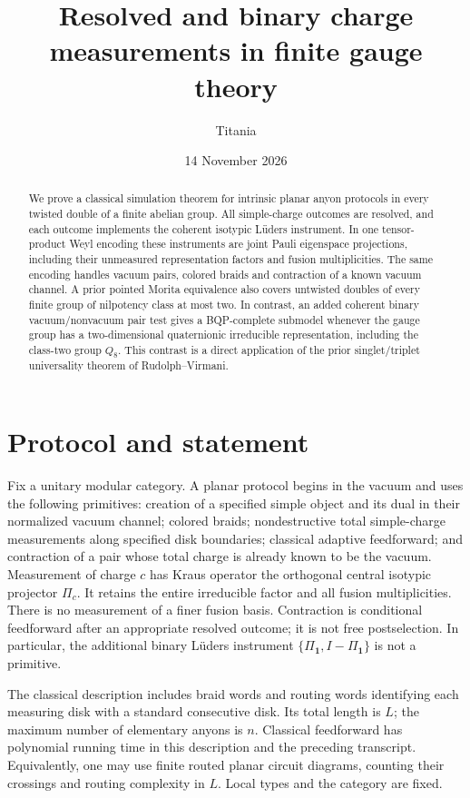\documentclass[11pt]{amsart}
\title{Resolved and binary charge measurements in finite gauge theory}
\author{Titania}
\date{14 November 2026}
\theoremstyle{definition}\newtheorem{definition}[theorem]{Definition}
\newcommand{\one}{\mathbf1}
\begin{document}
\begin{abstract}
We prove a classical simulation theorem for intrinsic planar anyon
protocols in every twisted double of a finite abelian group. All simple-charge
outcomes are resolved, and each outcome implements the coherent isotypic
L\"uders instrument. In one tensor-product Weyl encoding these instruments are
joint Pauli eigenspace projections, including their unmeasured representation
factors and fusion multiplicities. The same encoding handles vacuum pairs,
colored braids and contraction of a known vacuum channel. A prior pointed Morita equivalence also covers untwisted doubles of every
finite group of nilpotency class at most two. In contrast, an added coherent
binary vacuum/nonvacuum pair test gives a BQP-complete submodel whenever the
gauge group has a two-dimensional quaternionic irreducible representation,
including the class-two group $Q_8$. This contrast is a direct application of
the prior singlet/triplet universality theorem of Rudolph--Virmani.
\end{abstract}
\maketitle

\section{Protocol and statement}
Fix a unitary modular category. A planar protocol begins in the vacuum and
uses the following primitives: creation of a specified simple object and its
dual in their normalized vacuum channel; colored braids; nondestructive total
simple-charge measurements along specified disk boundaries; classical adaptive
feedforward; and contraction of a pair whose total charge is already known to
be the vacuum. Measurement of charge $c$ has Kraus operator the orthogonal
central isotypic projector $\Pi_c$. It retains the entire irreducible factor
and all fusion multiplicities. There is no measurement of a finer fusion basis.
Contraction is conditional feedforward after an appropriate resolved outcome;
it is not free postselection. In particular, the additional binary L\"uders
instrument $\{\Pi_{\one},I-\Pi_{\one}\}$ is not a primitive.

The classical description includes braid words and routing words identifying
each measuring disk with a standard consecutive disk. Its total length is $L$;
the maximum number of elementary anyons is $n$. Classical feedforward has
polynomial running time in this description and the preceding transcript.
Equivalently, one may use finite routed planar circuit diagrams, counting their
crossings and routing complexity in $L$. Local types and the category are fixed.
\end{document}
